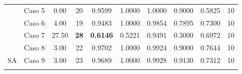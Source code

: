 \begin{table}
{\begin{tabular}{cccccccccc}
			\multicolumn{1}{c|}{}                      & Caso 5                        & 0.00                                                                 & 20                                                                 & 0.9599                                                  & 1.0000                        & 1.0000                        & 0.9000                        & 0.5825                        & 10                                                                   \\
			\multicolumn{1}{c|}{}                      & {\color[HTML]{003532} Caso 6} & {\color[HTML]{003532} 4.00}                                          & {\color[HTML]{003532} 19}                                          & {\color[HTML]{003532} 0.9483}                           & {\color[HTML]{003532} 1.0000} & {\color[HTML]{003532} 0.9854} & {\color[HTML]{003532} 0.7895} & {\color[HTML]{003532} 0.7300} & {\color[HTML]{003532} 10}                                            \\
			\multicolumn{1}{c|}{}                      & Caso 7                        & 27.50                                                                & {\color[HTML]{9A0000} \textbf{28}}                                 & {\color[HTML]{9A0000} \textbf{0.6146}}                  & 0.5221                        & 0.9491                        & 0.3000                        & 0.6972                        & 10                                                                   \\
			\multicolumn{1}{c|}{}                      & {\color[HTML]{003532} Caso 8} & {\color[HTML]{003532} 3.00}                                          & {\color[HTML]{003532} 22}                                          & {\color[HTML]{003532} 0.9702}                           & {\color[HTML]{003532} 1.0000} & {\color[HTML]{003532} 0.9924} & {\color[HTML]{003532} 0.9000} & {\color[HTML]{003532} 0.7644} & {\color[HTML]{003532} 10}                                            \\
			\multicolumn{1}{c|}{\multirow{-8}{*}{SA}}  & Caso 9                        & 3.00                                                                 & 23                                                                 & 0.9689                                                  & 1.0000                        & 0.9928                        & 0.9130                        & 0.7312                        & 10                                                                   \\
			\multicolumn{10}{c}{}                                                                                                                                                                                                                                                                                                                                                                                                                                                                   \\

\end{tabular}}
\end{table}

